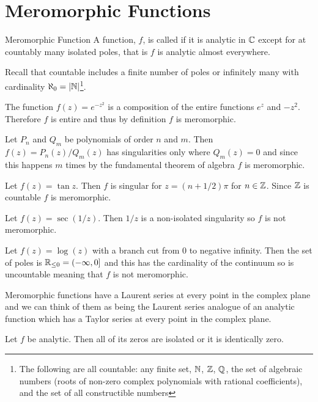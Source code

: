 \documentclass{article}
\begin{document}
    \section{Meromorphic Functions}
    \begin{definition}{Meromorphic Function}{}
        A function, \(f\), is called  if it is analytic in \(\mathbb{C}\) except for at countably many isolated poles, that is \(f\) is analytic almost everywhere.
    \end{definition}
    Recall that countable includes a finite number of poles or infinitely many with cardinality \(\aleph_0 = \abs{\mathbb{N}}\)\footnote{The following are all countable: any finite set, \(\mathbb{N}\), \(\mathbb{Z}\), \(\mathbb{Q}\), the set of algebraic numbers (roots of non-zero complex polynomials with rational coefficients), and the set of all constructible numbers}.
    \begin{example}
        The function \(f(z) = e^{-z^2}\) is a composition of the entire functions \(e^z\) and \(-z^2\).
        Therefore \(f\) is entire and thus by definition \(f\) is meromorphic.
        
        Let \(P_n\) and \(Q_m\) be polynomials of order \(n\) and \(m\).
        Then \(f(z) = P_n(z)/Q_m(z)\) has singularities only where \(Q_m(z) = 0\) and since this happens \(m\) times by the fundamental theorem of algebra \(f\) is meromorphic.
        
        Let \(f(z) = \tan z\).
        Then \(f\) is singular for \(z = (n + 1/2)\pi\) for \(n\in\mathbb{Z}\).
        Since \(\mathbb{Z}\) is countable \(f\) is meromorphic.
        
        Let \(f(z) = \sec(1/z)\). Then \(1/z\) is a non-isolated singularity so \(f\) is not meromorphic.
        
        Let \(f(z) = \log(z)\) with a branch cut from \(0\) to negative infinity.
        Then the set of poles is \(\mathbb{R}_{\le 0} = (-\infty, 0]\) and this has the cardinality of the continuum so is uncountable meaning that \(f\) is not meromorphic.
    \end{example}
    Meromorphic functions have a Laurent series at every point in the complex plane and we can think of them as being the Laurent series analogue of an analytic function which has a Taylor series at every point in the complex plane.
    \begin{theorem}{}{}
        Let \(f\) be analytic.
        Then all of its zeros are isolated or it is identically zero.
    \end{theorem}
\end{document}
